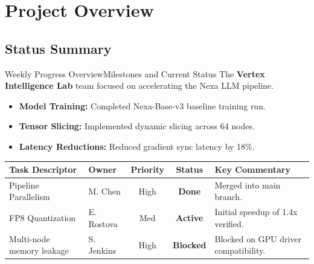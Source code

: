\section{Project Overview}
\subsection{Status Summary}

\begin{frame}{Weekly Progress Overview}{Milestones and Current Status}
  The \textbf{Vertex Intelligence Lab} team focused on accelerating the Nexa LLM pipeline.
  
  \vspace{0.15cm}
  \begin{itemize}
    \item \textbf{Model Training:} Completed Nexa-Base-v3 baseline training run.
    \item \textbf{Tensor Slicing:} Implemented dynamic slicing across 64 nodes.
    \item \textbf{Latency Reductions:} Reduced gradient sync latency by 18\%.
  \end{itemize}

  \vspace{0.25cm}
  {\small
  \begin{tabular}{llccp{4.2cm}}
    \toprule
    \textbf{Task Descriptor} & \textbf{Owner} & \textbf{Priority} & \textbf{Status} & \textbf{Key Commentary} \\
    \midrule
    Pipeline Parallelism & M. Chen & High & \textcolor{colorSuccess}{\textbf{Done}} & Merged into main branch. \\
    FP8 Quantization & E. Rostova & Med & \textcolor{colorWarning}{\textbf{Active}} & Initial speedup of 1.4x verified. \\
    Multi-node memory leakage & S. Jenkins & High & \textcolor{colorBlocker}{\textbf{Blocked}} & Blocked on GPU driver compatibility. \\
    \bottomrule
  \end{tabular}
  }
\end{frame}
